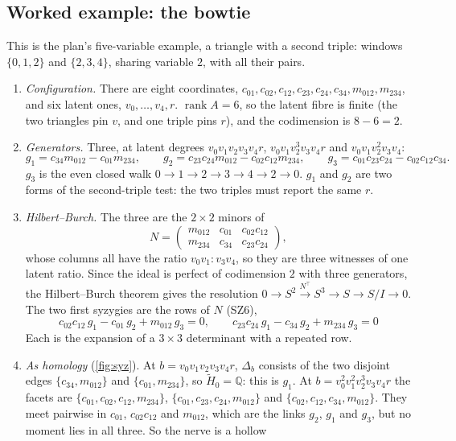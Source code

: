 \documentclass[11pt]{article}
\theoremstyle{definition}\newtheorem{definition}[theorem]{Definition}\newtheorem{remark}[theorem]{Remark}\newtheorem{example}[theorem]{Example}
\begin{document}
\subsection{Worked example: the bowtie}\label{ex:bowtie}
This is the plan's five-variable example, a triangle with a second triple: windows $\{0,1,2\}$ and $\{2,3,4\}$, sharing variable $2$, with all their pairs.
\begin{enumerate}
\item \emph{Configuration.} There are eight coordinates, $c_{01},c_{02},c_{12},c_{23},c_{24},c_{34},m_{012},m_{234}$, and six latent
  ones, $v_0,\dots,v_4,r$. $\operatorname{rank}A=6$, so the latent fibre is finite (the two triangles pin $v$, and one triple pins
  $r$), and the codimension is $8-6=2$.
\item \emph{Generators.} Three, at latent degrees $v_0v_1v_2v_3v_4r$, $v_0v_1v_2^3v_3v_4r$ and $v_0v_1v_2^2v_3v_4$:
\[
g_1=c_{34}m_{012}-c_{01}m_{234},\qquad g_2=c_{23}c_{24}m_{012}-c_{02}c_{12}m_{234},\qquad g_3=c_{01}c_{23}c_{24}-c_{02}c_{12}c_{34}.
\]
  $g_3$ is the even closed walk $0\to1\to2\to3\to4\to2\to0$. $g_1$ and $g_2$ are two forms of the second-triple test: the two triples
  must report the same $r$.
\item \emph{Hilbert--Burch.} The three are the $2\times2$ minors of
\[
N=\begin{pmatrix}m_{012}&c_{01}&c_{02}c_{12}\\ m_{234}&c_{34}&c_{23}c_{24}\end{pmatrix},
\]
  whose columns all have the ratio $v_0v_1:v_3v_4$, so they are three witnesses of one latent ratio. Since the ideal is perfect of
  codimension $2$ with three generators, the Hilbert--Burch theorem \cite[Theorem 20.15]{Eisenbud1995} gives the resolution
  $0\to S^2\xrightarrow{N^\top}S^3\to S\to S/I\to0$. The two first syzygies are the rows of $N$ (SZ6),
\[
c_{02}c_{12}\,g_1-c_{01}\,g_2+m_{012}\,g_3=0,\qquad c_{23}c_{24}\,g_1-c_{34}\,g_2+m_{234}\,g_3=0
\]
  Each is the expansion of a $3\times3$ determinant with a repeated row.
\item \emph{As homology} (\cref{fig:syz}). At $b=v_0v_1v_2v_3v_4r$, $\Delta_b$ consists of the two disjoint edges $\{c_{34},m_{012}\}$ and
  $\{c_{01},m_{234}\}$, so $\tilde H_0=\mathbb Q$: this is $g_1$. At $b=v_0^2v_1^2v_2^3v_3v_4r$ the facets are
  $\{c_{01},c_{02},c_{12},m_{234}\}$, $\{c_{01},c_{23},c_{24},m_{012}\}$ and $\{c_{02},c_{12},c_{34},m_{012}\}$. They meet pairwise in
  $c_{01}$, $c_{02}c_{12}$ and $m_{012}$, which are the links $g_2$, $g_1$ and $g_3$, but no moment lies in all three. So the nerve is a hollow

\end{enumerate}
\end{document}
